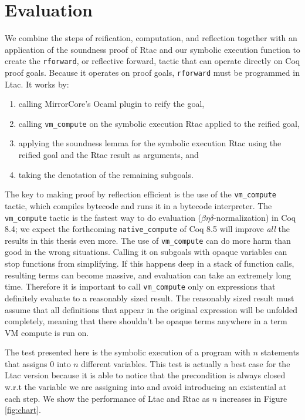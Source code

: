 \documentclass{puthesis}
\begin{document}
\chapter{Evaluation}
\label{ch:evaluation}
We combine the steps of reification, computation, and reflection
together with an application of the soundness proof of Rtac and our
symbolic execution function to create the \lstinline|rforward|, or
reflective forward, tactic that can operate directly on Coq proof
goals. Because it operates on proof goals, \lstinline|rforward| must
be programmed in Ltac.  It works by:
\begin{enumerate}
\item calling MirrorCore's Ocaml plugin to reify the goal,
\item calling \lstinline|vm_compute| on the symbolic execution Rtac
  applied to the reified goal,
\item applying the soundness lemma for the symbolic execution Rtac
  using the reified goal and the Rtac result as arguments, and
\item taking the denotation of the remaining subgoals.
\end{enumerate}
The key to making proof by reflection efficient is the use of the
\lstinline|vm_compute| tactic, which compiles bytecode and runs it in
a bytecode interpreter. The \lstinline|vm_compute| tactic is the
fastest way to do evaluation ($\beta\eta\delta$-normalization) in Coq
8.4; we expect the forthcoming \lstinline{native_compute} of Coq 8.5
will improve \emph{all} the results in this thesis even more.  The use
of \lstinline|vm_compute| can do more harm than good in the wrong
situations. Calling it on subgoals with opaque variables can stop
functions from simplifying. If this happens deep in a stack of
function calls, resulting terms can become massive, and evaluation can
take an extremely long time. Therefore it is important to call
\lstinline|vm_compute| only on expressions that definitely evaluate to
a reasonably sized result. The reasonably sized result must assume
that all definitions that appear in the original expression will be
unfolded completely, meaning that there shouldn't be opaque terms
anywhere in a term VM compute is run on.
  
The test presented here is the symbolic execution of a program with
$n$ statements that assigns $0$ into $n$ different variables. This
test is actually a best case for the Ltac version because it is able
to notice that the precondition is always closed w.r.t the variable we
are assigning into and avoid introducing an existential at each
step. 
We show the performance of Ltac and
Rtac as $n$ increases in Figure \ref{fig:chart}.
\end{document}
